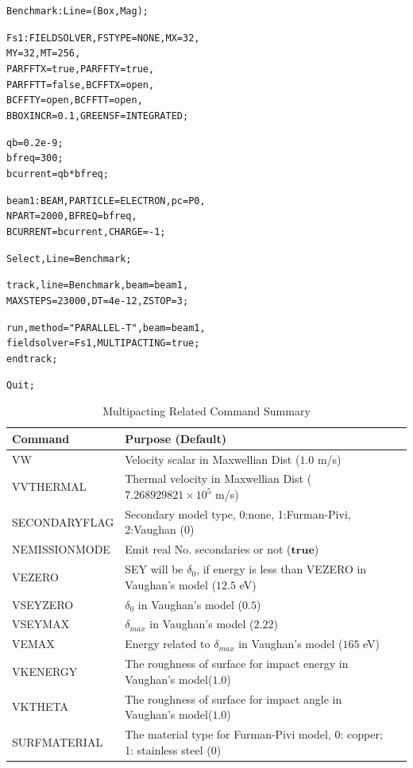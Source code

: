 \begin{alltt}
Benchmark: Line = (Box, Mag);

Fs1:FIELDSOLVER, FSTYPE = NONE, MX = 32, 
                 MY = 32, MT = 256,
		 PARFFTX = true, PARFFTY = true, 
                 PARFFTT = false, BCFFTX = open, 
                 BCFFTY = open, BCFFTT = open,
		 BBOXINCR = 0.1, GREENSF = INTEGRATED;
		 
qb=0.2e-9;
bfreq=300;
bcurrent=qb*bfreq;

beam1: BEAM, PARTICLE = ELECTRON, pc = P0, 
             NPART = 2000, BFREQ = bfreq , 
             BCURRENT = bcurrent, CHARGE =-1;

Select, Line=Benchmark;

track, line= Benchmark, beam=beam1, 
       MAXSTEPS=23000, DT=4e-12, ZSTOP=3;  

run, method = "PARALLEL-T", beam = beam1, 
     fieldsolver = Fs1, MULTIPACTING=true;
endtrack;

Quit;

\end{alltt}

\begin{table}[ht] \footnotesize
  \begin{center}
    \caption{Multipacting Related Command Summary}
    \label{tab:Multipactingcmd}
    \begin{tabular}{|l|p{}|l|}
      \hline
      Command &Purpose (Default) \\
      \hline
      VW&Velocity scalar in Maxwellian Dist ($1.0$ m/s)\\
      VVTHERMAL&Thermal velocity in Maxwellian Dist ($7.268929821\times10^5$ m/s)\\
      SECONDARYFLAG&Secondary model type, 0:none, 1:Furman-Pivi, 2:Vaughan ($0$)\\
      NEMISSIONMODE&Emit real No. secondaries or not ($\mathbf{true}$)\\
      VEZERO&SEY will be $\delta_0$, if energy is less than VEZERO in Vaughan's model ($12.5$ eV)\\
      VSEYZERO&$\delta_0$ in Vaughan's model ($0.5$)\\
      VSEYMAX&$\delta_{max}$ in Vaughan's model ($2.22$)\\
      VEMAX&Energy related to $\delta_{max}$ in Vaughan's model ($165$ eV)\\
      VKENERGY&The roughness of surface for impact energy in Vaughan's model($1.0$) \\
      VKTHETA&The roughness of surface for impact angle in Vaughan's model($1.0$)\\
      SURFMATERIAL&The material type for Furman-Pivi model, 0: copper; 1: stainless steel ($0$)\\
      \hline
    \end{tabular}
  \end{center}
\end{table}

